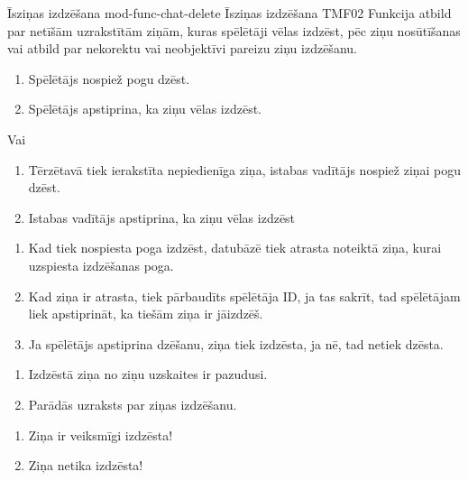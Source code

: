 \moduleFunctionTable
{Īsziņas izdzēšana}
{mod-func-chat-delete}
{Īsziņas izdzēšana}
{TMF02}
{
	Funkcija atbild par netīšām uzrakstītām ziņām, kuras spēlētāji vēlas izdzēst, pēc ziņu nosūtīšanas vai atbild par nekorektu vai neobjektīvi pareizu ziņu izdzēšanu.
}
{
	\begin{enumerate}
		\item Spēlētājs nospiež pogu dzēst.
		\item Spēlētājs apstiprina, ka ziņu vēlas izdzēst.
	\end{enumerate}
	Vai
	\begin{enumerate}
		\item Tērzētavā tiek ierakstīta nepiedienīga ziņa, istabas vadītājs nospiež ziņai pogu dzēst.
		\item Istabas vadītājs apstiprina, ka ziņu vēlas izdzēst
	\end{enumerate}
}
{
	\begin{enumerate}
		\item Kad tiek nospiesta poga izdzēst, datubāzē tiek atrasta noteiktā ziņa, kurai uzspiesta izdzēšanas poga.
		\item Kad ziņa ir atrasta, tiek pārbaudīts spēlētāja ID, ja tas sakrīt, tad spēlētājam liek apstiprināt, ka tiešām ziņa ir jāizdzēš.
		\item Ja spēlētājs apstiprina dzēšanu, ziņa tiek izdzēsta, ja nē, tad netiek dzēsta.
	\end{enumerate}
}
{
	\begin{enumerate}
		\item Izdzēstā ziņa no ziņu uzskaites ir pazudusi.
		\item Parādās uzraksts par ziņas izdzēšanu.
	\end{enumerate}
}
{
	\begin{enumerate}
		\item Ziņa ir veiksmīgi izdzēsta!
		\item Ziņa netika izdzēsta!
	\end{enumerate}
}
